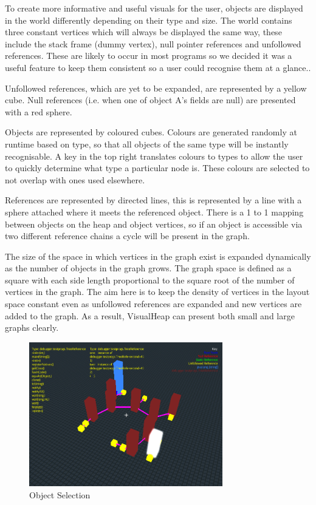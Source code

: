 \documentclass[11pt, a4paper]{report}
\begin{document}
To create more informative and useful visuals for the user, objects are displayed in the world differently depending on their type and size. The world contains three constant vertices which will always be displayed the same way, these include the stack frame (dummy vertex), null pointer references and unfollowed references. These are likely to occur in most programs so we decided it was a useful feature to keep them consistent so a user could recognise them at a glance..

Unfollowed references, which are yet to be expanded, are represented by a yellow cube.
Null references (i.e. when one of object A’s fields are null) are presented with a red sphere.

Objects are represented by coloured cubes. Colours are generated randomly at runtime based on type, so that all objects of the same type will be instantly recognisable. A key in the top right translates colours to types to allow the user to quickly determine what type a particular node is. These colours are selected to not overlap with ones used elsewhere.

References are represented by directed lines, this is represented by a line with a sphere attached where it meets the referenced object. There is a 1 to 1 mapping between objects on the heap and object vertices, so if an object is accessible via two different reference chains a cycle will be present in the graph. 

The size of the space in which vertices in the graph exist is expanded dynamically as the number of objects in the graph grows.  The graph space is defined as a square with each side length proportional to the square root of the number of vertices in the graph. The aim here is to keep the density of vertices in the layout space constant even as unfollowed references are expanded and new vertices are added to the graph. As a result, VisualHeap can present both small and large graphs clearly.

\begin{figure}[h]
        \centering
        \includegraphics[width=0.75\textwidth]{images/final/dynamicoff.png}
        \caption{Object Selection}
\end{figure}
\end{document}
